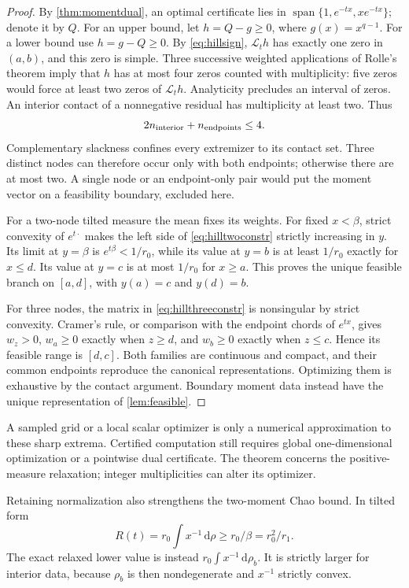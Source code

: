 \documentclass[11pt]{article}
\numberwithin{equation}{section}
\theoremstyle{definition}
\theoremstyle{remark}
\newcommand{\Span}{\operatorname{span}}
\newcommand{\dd}{\,\mathrm d}
\begin{document}
\begin{proof}
By \cref{thm:momentdual}, an optimal certificate lies in $\Span\{1,e^{-tx},xe^{-tx}\}$; denote it by $Q$. For an upper bound, let $h=Q-g\ge0$, where $g(x)=x^{q-1}$. For a lower bound use $h=g-Q\ge0$. By \eqref{eq:hillsign}, $\mathcal L_th$ has exactly one zero in $(a,b)$, and this zero is simple. Three successive weighted applications of Rolle's theorem imply that $h$ has at most four zeros counted with multiplicity: five zeros would force at least two zeros of $\mathcal L_th$. Analyticity precludes an interval of zeros. An interior contact of a nonnegative residual has multiplicity at least two. Thus
\[
 2n_{\rm interior}+n_{\rm endpoints}\le4.
\]
Complementary slackness confines every extremizer to its contact set. Three distinct nodes can therefore occur only with both endpoints; otherwise there are at most two. A single node or an endpoint-only pair would put the moment vector on a feasibility boundary, excluded here.

For a two-node tilted measure the mean fixes its weights. For fixed $x<\beta$, strict convexity of $e^{t\cdot}$ makes the left side of \eqref{eq:hilltwoconstr} strictly increasing in $y$. Its limit at $y=\beta$ is $e^{t\beta}<1/r_0$, while its value at $y=b$ is at least $1/r_0$ exactly for $x\le d$. Its value at $y=c$ is at most $1/r_0$ for $x\ge a$. This proves the unique feasible branch on $[a,d]$, with $y(a)=c$ and $y(d)=b$.

For three nodes, the matrix in \eqref{eq:hillthreeconstr} is nonsingular by strict convexity. Cramer's rule, or comparison with the endpoint chords of $e^{tx}$, gives $w_z>0$, $w_a\ge0$ exactly when $z\ge d$, and $w_b\ge0$ exactly when $z\le c$. Hence its feasible range is $[d,c]$. Both families are continuous and compact, and their common endpoints reproduce the canonical representations. Optimizing them is exhaustive by the contact argument. Boundary moment data instead have the unique representation of \cref{lem:feasible}.
\end{proof}
A sampled grid or a local scalar optimizer is only a numerical approximation to these sharp extrema. Certified computation still requires global one-dimensional optimization or a pointwise dual certificate. The theorem concerns the positive-measure relaxation; integer multiplicities can alter its optimizer.

Retaining normalization also strengthens the two-moment Chao bound. In tilted form
\[
 R(t)=r_0\int x^{-1}\dd\rho\ge r_0/\beta=r_0^2/r_1.
\]
The exact relaxed lower value is instead $r_0\int x^{-1}\dd\rho_b$. It is strictly larger for interior data, because $\rho_b$ is then nondegenerate and $x^{-1}$ strictly convex.
\end{document}
